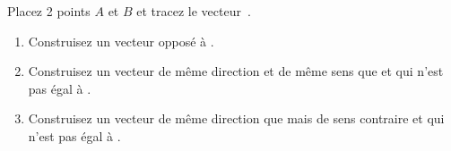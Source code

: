 \exercice Placez 2 points $A$ et $B$ et tracez le vecteur~.
\begin{enumerate}
	\item Construisez un vecteur opposé à .
	\item Construisez un vecteur de même direction et de même sens que  et qui n'est pas égal à .
	\item Construisez un vecteur de même direction que  mais de sens contraire et qui n'est pas égal à .
\end{enumerate}